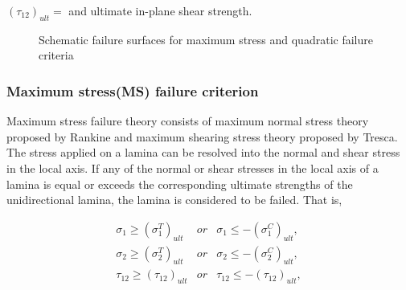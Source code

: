 $(\tau_{12})_{ult}= $ and ultimate in-plane shear strength.

\begin{figure}[ht]
\centering
{}
\caption{Schematic failure surfaces for maximum stress and quadratic failure
criteria}
\label{fig:failure_surface}
\end{figure}

\subsubsection{Maximum stress(MS) failure criterion}
Maximum stress failure theory consists of maximum normal stress theory proposed
by Rankine and maximum shearing stress theory proposed by Tresca. The stress
applied on a lamina can be resolved into the normal and shear stress in the
local axis. If any of the normal or shear stresses in the local axis of a
lamina is equal or exceeds the corresponding ultimate strengths of the
unidirectional lamina, the lamina is considered to be failed. That is,

\begin{equation}
	\begin{array}{lll}
		\sigma_1 \geq (\sigma _1^{T})_{ult} & \textstyle{ or } &  \sigma_1 \leq -(\sigma _1^{C})_{ult} \textstyle{,} \\
		\sigma_2 \geq (\sigma _2^{T})_{ult} & \textstyle{ or } &   \sigma_2 \leq -(\sigma _2^{C})_{ult} \textstyle{,} \\
		\tau_{12} \geq (\tau_{12})_{ult}    & \textstyle{ or } &     \tau_{12} \leq -(\tau_{12})_{ult}  \textstyle{,}
\end{array}
\end{equation}

